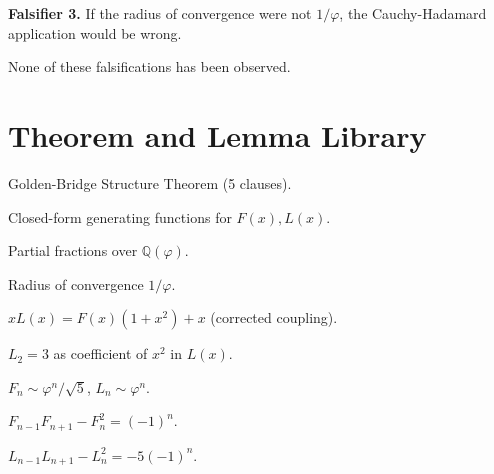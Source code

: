 \textbf{Falsifier 3.} If the radius of convergence were not $1/\varphi$,
the Cauchy-Hadamard application would be wrong.

None of these falsifications has been observed.

\section{Theorem and Lemma Library}
\label{sec:05-library}

\begin{theorem}
Golden-Bridge Structure Theorem (5 clauses).
\end{theorem}

\begin{theorem}
Closed-form generating functions for $F(x), L(x)$.
\end{theorem}

\begin{theorem}
Partial fractions over $\mathbb{Q}(\varphi)$.
\end{theorem}

\begin{theorem}
Radius of convergence $1/\varphi$.
\end{theorem}

\begin{theorem}
$x L(x) = F(x)(1+x^2) + x$ (corrected coupling).
\end{theorem}

\begin{theorem}
$L_2 = 3$ as coefficient of $x^2$ in $L(x)$.
\end{theorem}

\begin{theorem}
$F_n \sim \varphi^n/\sqrt{5}$, $L_n \sim \varphi^n$.
\end{theorem}

\begin{theorem}
$F_{n-1} F_{n+1} - F_n^2 = (-1)^n$.
\end{theorem}

\begin{theorem}
$L_{n-1} L_{n+1} - L_n^2 = -5(-1)^n$.
\end{theorem}

